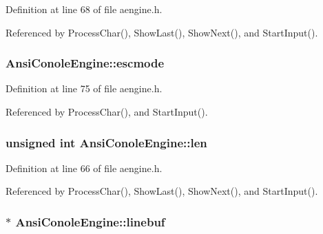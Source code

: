 Definition at line 68 of file aengine.\+h.



Referenced by Process\+Char(), Show\+Last(), Show\+Next(), and Start\+Input().

\subsubsection[{\texorpdfstring{escmode}{escmode}}]{ Ansi\+Conole\+Engine\+::escmode\hspace{0.3cm}{\ttfamily [private]}}\hypertarget{classAnsiConoleEngine_af497f5cbdca8bbc350935a90568b06e7}{}\label{classAnsiConoleEngine_af497f5cbdca8bbc350935a90568b06e7}


Definition at line 75 of file aengine.\+h.



Referenced by Process\+Char(), and Start\+Input().

\subsubsection[{\texorpdfstring{len}{len}}]{\setlength{\rightskip}{0pt plus 5cm}unsigned int Ansi\+Conole\+Engine\+::len\hspace{0.3cm}{\ttfamily [private]}}\hypertarget{classAnsiConoleEngine_ad5d65280df848947f5b2dda80dcf35c6}{}\label{classAnsiConoleEngine_ad5d65280df848947f5b2dda80dcf35c6}


Definition at line 66 of file aengine.\+h.



Referenced by Process\+Char(), Show\+Last(), Show\+Next(), and Start\+Input().

\subsubsection[{\texorpdfstring{linebuf}{linebuf}}]{$\ast$ Ansi\+Conole\+Engine\+::linebuf\hspace{0.3cm}{\ttfamily [private]}}\hypertarget{classAnsiConoleEngine_a6bf88afa72a458e3687972f9e666cd86}{}\label{classAnsiConoleEngine_a6bf88afa72a458e3687972f9e666cd86}



